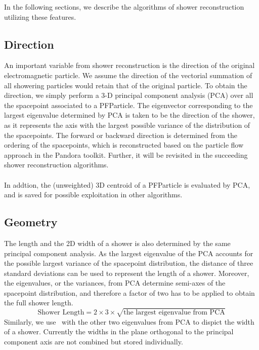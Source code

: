 In the following sections, we describe the algorithms of shower reconstruction 
utilizing these features.

\subsection{Direction}
\label{sec:shr_direction}

An important variable from shower reconstruction is the direction of the 
original electromagnetic particle.
We assume the direction of the vectorial summation of all showering particles 
would retain that of the original particle.
To obtain the direction,
we simply perform a 3-D principal component 
analysis (PCA) over all the spacepoint associated to a PFParticle.
The eigenvector corresponding to the largest eigenvalue determined by
PCA is taken to be the direction of the shower, as it represents the axis
with the largest possible variance of the distribution of the spacepoints.
The forward or backward direction is determined from the ordering of
the spacepoints, which is reconstructed based on the particle flow approach in
the Pandora toolkit.
Further, it will be revisited in the succeeding
shower reconstruction algorithms.\\
\\
In addtion, the (unweighted) 3D centroid of a PFParticle is evaluated
by PCA, and is saved for possible exploitation in other algorithms.

\subsection{Geometry}
\label{sec:shr_geometry}

The length and the 2D width of a shower is also determined by the same
principal component analysis.
As the largest eigenvalue of the PCA accounts for the possible largest
variance of the spacepoint distribution, the distance of three
standard deviations can be used to represent the length of a shower.
Moreover, the eigenvalues, or the variances, from PCA determine semi-axes
of the spacepoint distribution, and therefore a factor of two has to be
applied to obtain the full shower length.
\begin{equation}
\label{eq:shrlength}
\textrm{Shower Length} = 2\times 3\times \sqrt{\textrm{the largest eigenvalue from PCA}}
\end{equation}
Similarly, we use~ with the other two eigenvalues
from PCA to dispict the width of a shower.
Currently the widths in the plane orthogonal to the principal component
axis are not combined but stored individually.

